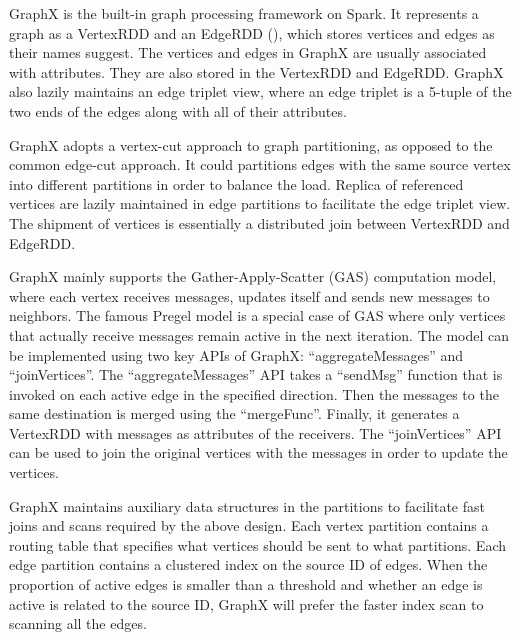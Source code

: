 GraphX  is the built-in graph processing framework on Spark.
It represents a graph as a VertexRDD and an EdgeRDD
(), which stores vertices and edges as their names
suggest. The vertices and edges in GraphX are usually associated with
attributes. They are also stored in the VertexRDD and EdgeRDD. GraphX also lazily
maintains an edge triplet view, where an edge triplet is a 5-tuple of the two
ends of the edges along with all of their attributes.

GraphX adopts a vertex-cut approach to graph partitioning, as opposed to the
common edge-cut approach. It could partitions edges with the same source vertex
into different partitions in order to balance the load. Replica of referenced
vertices are lazily maintained in edge partitions to facilitate the edge
triplet view.  The shipment of vertices is essentially a distributed join
between VertexRDD and EdgeRDD.

GraphX mainly supports the Gather-Apply-Scatter (GAS) computation model, where
each vertex receives messages, updates itself and sends new messages to
neighbors. The famous Pregel  model is a special case of GAS where
only vertices that actually receive messages remain active in the next
iteration. The model can be implemented using two key APIs of GraphX:
``aggregateMessages'' and ``joinVertices''. The ``aggregateMessages'' API
takes a ``sendMsg'' function that is invoked on each active edge in the
specified direction. Then the messages to the same destination is merged using
the ``mergeFunc''. Finally, it generates a VertexRDD with
messages as attributes of the receivers. The ``joinVertices'' API can be used
to join the original vertices with the messages in order to update the
vertices.

GraphX maintains auxiliary data structures in the partitions to facilitate fast
joins and scans required by the above design. Each vertex partition contains a
routing table that specifies what vertices should be sent to what 
partitions. Each edge partition contains a clustered index on the source ID of
edges. When the proportion of active edges is smaller than a threshold and
whether an edge is active is related to the source ID, GraphX will prefer the
faster index scan to scanning all the edges.
